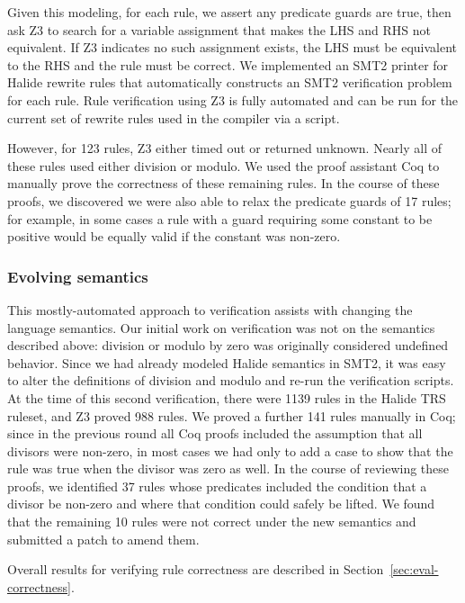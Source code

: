 \documentclass[acmsmall,review]{acmart}\settopmatter{printfolios=true,printccs=false,printacmref=false}
\newcommand{\NumPredicatesRelaxed}{{\color{black} 17}\xspace}
\newcommand{\NumZdivRules}{{\color{black} 1139}\xspace}
\newcommand{\NumZdivZThreeProvedRules}{{\color{black} 988}\xspace}
\newcommand{\NumZdivCoqProvedRules}{{\color{black} 141}\xspace}
\newcommand{\NumZdivFalseRules}{{\color{black} 10}\xspace}
\newcommand{\NumZdivRelaxedPredicates}{{\color{black} 37}\xspace}
\begin{document}
Given this modeling, for each rule, we assert any predicate guards are true, then
ask Z3 to search for a variable assignment that makes the LHS and RHS not
equivalent.  If Z3 indicates no such assignment exists, the LHS must be equivalent to
the RHS and the rule must be correct. We implemented an SMT2 printer for 
Halide rewrite rules that automatically constructs an SMT2 verification problem for each rule.
Rule verification using Z3 is fully automated
and can be run for the current set of rewrite rules used in the compiler via a script.

However, for 123
rules, Z3 either timed out or returned unknown. Nearly all of these rules used
either division or modulo. We used the proof assistant Coq to manually prove the
correctness of these remaining rules. In the course of these proofs, we
discovered we were also able to relax the predicate guards of \NumPredicatesRelaxed
rules; for example, in some cases a rule
with a guard requiring some constant to be positive would be equally valid
if the constant was non-zero.


\subsubsection{Evolving semantics}
\label{sub:evolvingsemantics}

This mostly-automated approach to verification assists with changing
the language semantics. Our initial work on verification was not on
the semantics described above: division or modulo by zero was originally
considered undefined behavior. Since we had already
modeled Halide semantics in SMT2, it was easy to alter the
definitions of division and modulo and re-run the verification scripts.
At the time of this second verification, there were
\NumZdivRules rules in the Halide TRS ruleset, and Z3 proved \NumZdivZThreeProvedRules
rules. We proved a further \NumZdivCoqProvedRules rules 
manually in Coq; since in the previous round all Coq proofs
included the assumption that all divisors were non-zero, in most cases
we had only to add a case to show that the rule was true when the
divisor was zero as well. In the course of reviewing
these proofs, we identified \NumZdivRelaxedPredicates rules whose
predicates included the condition that a divisor be non-zero and where
that condition could safely be lifted. We found that the remaining
\NumZdivFalseRules rules were not correct under the new semantics and
submitted a patch to amend them.

Overall results for verifying rule correctness are described in Section~\ref{sec:eval-correctness}.
\end{document}
